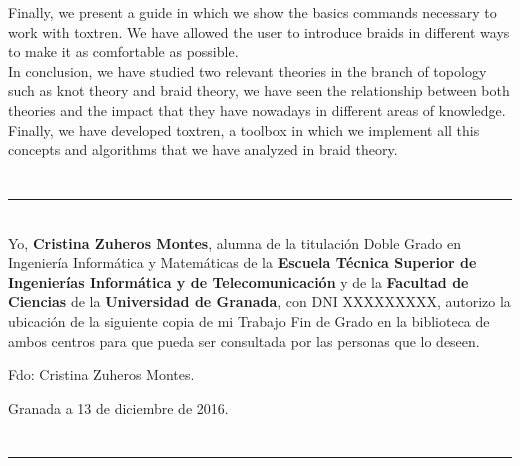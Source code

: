 Finally, we present a guide in which we show the basics commands necessary to work with toxtren. We have allowed the user to introduce braids in different ways to make it as comfortable as possible.\\

\newpage
In conclusion, we have studied two relevant theories in the branch of topology such as knot theory and braid theory, we have seen the relationship between both theories and the impact that they have nowadays in different areas of knowledge. Finally, we have developed toxtren, a toolbox in which we implement all this concepts and algorithms that we have analyzed in braid theory.\\








\chapter*{}
\thispagestyle{empty}

\noindent\rule[-1ex]{\textwidth}{2pt}\\[4.5ex]

Yo, \textbf{Cristina Zuheros Montes}, alumna de la titulación Doble Grado en
Ingeniería Informática y Matemáticas de la \textbf{Escuela Técnica Superior
	de Ingenierías Informática y de Telecomunicación} y de la \textbf{Facultad de Ciencias}
de la \textbf{Universidad de Granada}, con DNI XXXXXXXXX, autorizo la
ubicación de la siguiente copia de mi Trabajo Fin de Grado en la biblioteca de
ambos centros para que pueda ser consultada por las personas que lo deseen.

\vspace{6cm}

\noindent Fdo: Cristina Zuheros Montes.

\vspace{2cm}

\begin{flushright}
	Granada a 13 de diciembre de 2016.
\end{flushright}



\chapter*{}
\thispagestyle{empty}

\noindent\rule[-1ex]{\textwidth}{2pt}\\[4.5ex]

